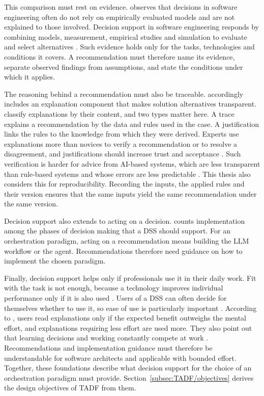 This comparison must rest on evidence. \textcite{ruheSoftwareDesicionsupport} observes that decisions in software engineering often do not rely on empirically evaluated models and are not explained to those involved. Decision support in software engineering responds by combining models, measurement, empirical studies and simulation to evaluate and select alternatives \parencite{ruheSoftwareDesicionsupport}. Such evidence holds only for the tasks, technologies and conditions it covers. A recommendation must therefore name its evidence, separate observed findings from assumptions, and state the conditions under which it applies. 

The reasoning behind a recommendation must also be traceable. \textcite{ruheSoftwareDesicionsupport} accordingly includes an explanation component that makes solution alternatives transparent. \textcite{gregorExplanationsIntelligentSystems1999} classify explanations by their content, and two types matter here. A trace explains a recommendation by the data and rules used in the case. A justification links the rules to the knowledge from which they were derived. Experts use explanations more than novices to verify a recommendation or to resolve a disagreement, and justifications should increase trust and acceptance \parencite{gregorExplanationsIntelligentSystems1999}. Such verification is harder for advice from AI-based systems, which are less transparent than rule-based systems and whose errors are less predictable \parencite{jussupowAugmentingMedicalDiagnosis2021}. This thesis also considers this for reproducibility. Recording the inputs, the applied rules and their version ensures that the same inputs yield the same recommendation under the same version.

Decision support also extends to acting on a decision. \textcite{spragueFrameworkDevelopmentDecision1980} counts implementation among the phases of decision making that a DSS should support. For an orchestration paradigm, acting on a recommendation means building the LLM workflow or the agent. Recommendations therefore need guidance on how to implement the chosen paradigm. 

Finally, decision support helps only if professionals use it in their daily work. Fit with the task is not enough, because a technology improves individual performance only if it is also used \parencite{goodhueTaskTechnologyFitIndividual1995}. Users of a DSS can often decide for themselves whether to use it, so ease of use is particularly important \parencite{spragueFrameworkDevelopmentDecision1980}. According to \textcite{gregorExplanationsIntelligentSystems1999}, users read explanations only if the expected benefit outweighs the mental effort, and explanations requiring less effort are used more. They also point out that learning decisions and working constantly compete at work \parencite{lebovitzEngageNotEngage2022,gregorExplanationsIntelligentSystems1999}. Recommendations and implementation guidance must therefore be understandable for software architects and applicable with bounded effort. Together, these foundations describe what decision support for the choice of an orchestration paradigm must provide. Section~\ref{subsec:TADF/objectives} derives the design objectives of TADF from them.

